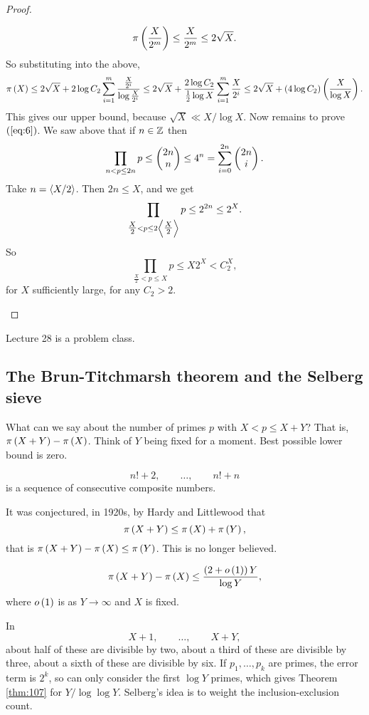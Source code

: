 \begin{proof}
\begin{itemize}
$$ \pi\left( \dfrac{X}{2^m} \right) \le \dfrac{X}{2^m} \le 2\sqrt{X}. $$
So substituting into the above,
$$ \pi\left( X \right) \le 2\sqrt{X} + 2\log C_2\sum_{i = 1}^m \dfrac{\tfrac{X}{2^i}}{\log \tfrac{X}{2^i}} \le 2\sqrt{X} + \dfrac{2\log C_2}{\tfrac{1}{2}\log X}\sum_{i = 1}^m \dfrac{X}{2^i} \le 2\sqrt{X} + \left( 4\log C_2 \right)\left( \dfrac{X}{\log X} \right). $$
This gives our upper bound, because $ \sqrt{X} \ll X / \log X $. Now remains to prove $ \left( \ref{eq:6} \right) $. We saw above that if $ n \in \mathbb{Z} $ then
$$ \prod_{n < p \le 2n} p \le \begin{pmatrix} 2n \\ n \end{pmatrix} \le 4^n = \sum_{i = 0}^{2n} \begin{pmatrix} 2n \\ i \end{pmatrix}. $$
Take $ n = \left\langle X / 2 \right\rangle $. Then $ 2n \le X $, and we get
$$ \prod_{\tfrac{X}{2} < p \le 2\left\langle \tfrac{X}{2} \right\rangle} p \le 2^{2n} \le 2^X. $$
So
$$ \prod_{\tfrac{X}{2} < p \le X} p \le X2^X < C_2^X, $$
for $ X $ sufficiently large, for any $ C_2 > 2 $.
\end{itemize}
\end{proof}


Lecture 28 is a problem class.


\subsection{The Brun-Titchmarsh theorem and the Selberg sieve}

What can we say about the number of primes $ p $ with $ X < p \le X + Y $? That is, $ \pi\left( X + Y \right) - \pi\left( X \right) $. Think of $ Y $ being fixed for a moment. Best possible lower bound is zero.

\begin{example*}
$$ n! + 2, \qquad \dots, \qquad n! + n $$
is a sequence of consecutive composite numbers.
\end{example*}

It was conjectured, in 1920s, by Hardy and Littlewood that
$$ \pi\left( X + Y \right) \le \pi\left( X \right) + \pi\left( Y \right), $$
that is $ \pi\left( X + Y \right) - \pi\left( X \right) \le \pi\left( Y \right) $. This is no longer believed.

\begin{theorem}
\label{thm:107}
$$ \pi\left( X + Y \right) - \pi\left( X \right) \le \dfrac{\left( 2 + o\left( 1 \right) \right)Y}{\log Y}, $$
where $ o\left( 1 \right) $ is as $ Y \to \infty $ and $ X $ is fixed.
\end{theorem}

In
$$ X + 1, \qquad \dots, \qquad X + Y, $$
about half of these are divisible by two, about a third of these are divisible by three, about a sixth of these are divisible by six. If $ p_1, \dots, p_k $ are primes, the error term is $ 2^k $, so can only consider the first $ \log Y $ primes, which gives Theorem \ref{thm:107} for $ Y / \log \log Y $. Selberg's idea is to weight the inclusion-exclusion count.

